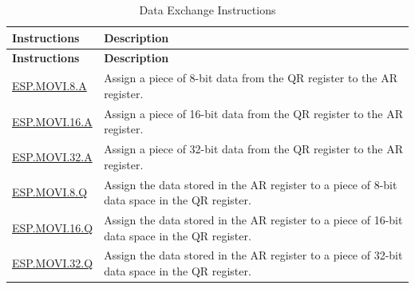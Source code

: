 \begin{longtable}[c]{|l|m{11cm}|}
    \caption{Data Exchange Instructions}
    \label{tab:pie-data-exchange-instructions}\\
    \hline
    \rowcolor{lightgray}
        \textbf{Instructions} & \textbf{Description} \\\hline
    \endfirsthead
    \rowcolor{lightgray}
    \textbf{Instructions} & \textbf{Description} \\\hline
    \endhead
    \endfoot

    \hyperref[instruction:ESPMOVI8A]{ESP.MOVI.8.A} & Assign a piece of 8-bit data from the QR register to the AR register.
    \\\hline
    \hyperref[instruction:ESPMOVI16A]{ESP.MOVI.16.A} & Assign a piece of 16-bit data from the QR register to the AR register.
    \\\hline

    \hyperref[instruction:ESPMOVI32A]{ESP.MOVI.32.A} & Assign a piece of 32-bit data from the QR register to the AR register.
    \\\hline
    \hyperref[instruction:ESPMOVI8Q]{ESP.MOVI.8.Q} & Assign the data stored in the AR register to a piece of 8-bit data space in the QR register.
    \\\hline
    \hyperref[instruction:ESPMOVI16Q]{ESP.MOVI.16.Q} & Assign the data stored in the AR register to a piece of 16-bit data space in the QR register.
    \\\hline
    \hyperref[instruction:ESPMOVI32Q]{ESP.MOVI.32.Q} & Assign the data stored in the AR register to a piece of 32-bit data space in the QR register.
    \\\hline


\end{longtable}
